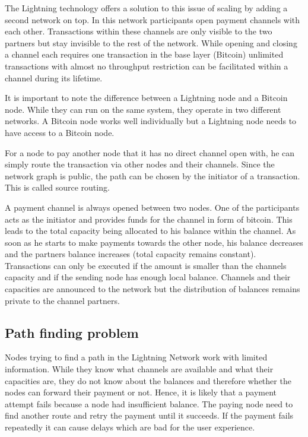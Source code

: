 \documentclass[final]{fhnwreport}       %
\begin{document}
The Lightning technology offers a solution to this issue of scaling by adding a second network on top. In this network participants open payment channels with each other. Transactions within these channels are only visible to the two partners but stay invisible to the rest of the network. While opening and closing a channel each requires one transaction in the base layer (Bitcoin) unlimited transactions with almost no throughput restriction can be facilitated within a channel during its lifetime. 

It is important to note the difference between a Lightning node and a Bitcoin node. While they can run on the same system, they operate in two different networks. A Bitcoin node works well individually but a Lightning node needs to have access to a Bitcoin node.

For a node to pay another node that it has no direct channel open with, he can simply route the transaction via other nodes and their channels. Since the network graph is public, the path can be chosen by the initiator of a transaction. This is called source routing. 

A payment channel is always opened between two nodes. One of the participants acts as the initiator and provides funds for the channel in form of bitcoin. This leads to the total capacity being allocated to his balance within the channel. As soon as he starts to make payments towards the other node, his balance decreases and the partners balance increases (total capacity remains constant). Transactions can only be executed if the amount is smaller than the channels capacity and if the sending node has enough local balance. Channels and their capacities are announced to the network but the distribution of balances remains private to the channel partners.

\subsection{Path finding problem}
Nodes trying to find a path in the Lightning Network work with limited information. While they know what channels are available and what their capacities are, they do not know about the balances and therefore whether the nodes can forward their payment or not. Hence, it is likely that a payment attempt fails because a node had insufficient balance. The paying node need to find another route and retry the payment until it succeeds. If the payment fails repeatedly it can cause delays which are bad for the user experience. 
\end{document}
